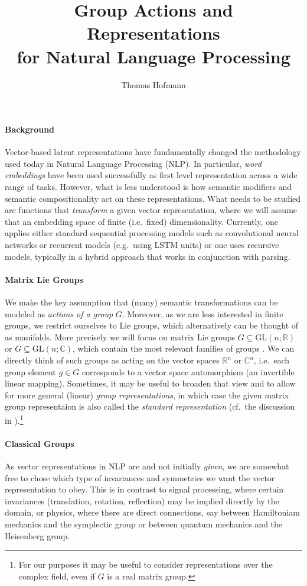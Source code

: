 \documentclass{article}
\author{Thomas Hofmann}
\title{Group Actions and Representations \\ for Natural Language Processing}
\newcommand{\RR}{{\mathbb R}}
\newcommand{\CC}{{\mathbb C}}
\begin{document}
\maketitle

\paragraph{Background} Vector-based latent representations have fundamentally changed the methodology used today in Natural Language Processing (NLP). In particular, \textit{word  embeddings} \cite{} have been used successfully as first level representation across a wide range of tasks. However, what is less understood is how semantic modifiers and semantic compositionality act on these representations. What needs to be studied are functions that \textit{transform} a given vector representation, where we will assume that an embedding space of finite (i.e.~fixed) dimensionality. Currently, one applies either standard sequential processing models such as convolutional neural networks or recurrent models (e.g.~using LSTM units) or one uses recursive models, typically in a hybrid approach that works in conjunction with parsing. 

\paragraph{Matrix Lie Groups} We make the key assumption that (many) semantic transformations can be modeled as \textit{actions of a group} $G$. Moreover, as we are less interested in finite groups, we restrict ourselves to Lie groups, which alternatively can be thought of as manifolds. More precisely we will focus on matrix Lie groups $G \subseteq \text{GL}(n;\RR)$ or $G \subseteq \text{GL}(n;\CC)$, which contain the most relevant families of groups \cite[Section 1]{hall2015lie}. We can directly think of such groups as acting on the vector spaces $\RR^n$ or $\CC^n$, i.e.~each group element $g \in G$ corresponds to a vector space automorphism (an invertible linear mapping). Sometimes, it may be useful to broaden that view and to allow for more general (linear) \textit{group representations}, in which case the given matrix group representaion is also called the \textit{standard representation} (cf.~the discussion in \cite[Section 4.2]{hall2015lie}).\footnote{For our purposes it may be useful to consider representations over the complex field, even if $G$ is a real matrix group.} 

\paragraph{Classical Groups} As vector representations in NLP are  and not initially \textit{given}, we are somewhat free to chose which type of invariances and symmetries we want the vector representation to obey. This is in contrast to signal processing, where certain invariances (translation, rotation, reflection) may be implied directly by the domain, or physics, where there are direct connections, say between Hamiltoniam mechanics and the symplectic group or between quantum mechanics and the Heisenberg group. 
\end{document}
